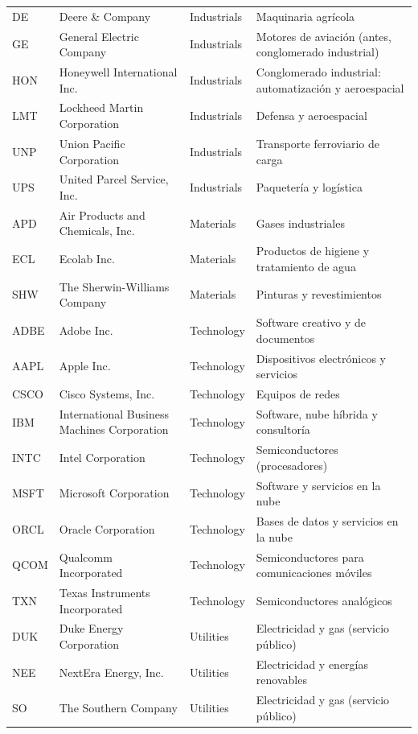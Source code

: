 \documentclass[12pt,letterpaper,oneside]{report}
\renewcommand{\_}{\UnderscoreOriginal\allowbreak}
\begin{document}
{\begin{longtable}{@{}l>{\raggedright}p{4.1cm}>{\raggedright}p{3.1cm}>{\raggedright\arraybackslash}p{5.3cm}@{}}
DE & Deere \& Company & Industrials & Maquinaria agrícola \\
GE & General Electric Company & Industrials & Motores de aviación (antes, conglomerado industrial) \\
HON & Honeywell International Inc. & Industrials & Conglomerado industrial: automatización y aeroespacial \\
LMT & Lockheed Martin Corporation & Industrials & Defensa y aeroespacial \\
UNP & Union Pacific Corporation & Industrials & Transporte ferroviario de carga \\
UPS & United Parcel Service, Inc. & Industrials & Paquetería y logística \\
APD & Air Products and Chemicals, Inc. & Materials & Gases industriales \\
ECL & Ecolab Inc. & Materials & Productos de higiene y tratamiento de agua \\
SHW & The Sherwin-Williams Company & Materials & Pinturas y revestimientos \\
ADBE & Adobe Inc. & Technology & Software creativo y de documentos \\
AAPL & Apple Inc. & Technology & Dispositivos electrónicos y servicios \\
CSCO & Cisco Systems, Inc. & Technology & Equipos de redes \\
IBM & International Business Machines Corporation & Technology & Software, nube híbrida y consultoría \\
INTC & Intel Corporation & Technology & Semiconductores (procesadores) \\
MSFT & Microsoft Corporation & Technology & Software y servicios en la nube \\
ORCL & Oracle Corporation & Technology & Bases de datos y servicios en la nube \\
QCOM & Qualcomm Incorporated & Technology & Semiconductores para comunicaciones móviles \\
TXN & Texas Instruments Incorporated & Technology & Semiconductores analógicos \\
DUK & Duke Energy Corporation & Utilities & Electricidad y gas (servicio público) \\
NEE & NextEra Energy, Inc. & Utilities & Electricidad y energías renovables \\
SO & The Southern Company & Utilities & Electricidad y gas (servicio público) \\
\end{longtable}
}
\end{document}
